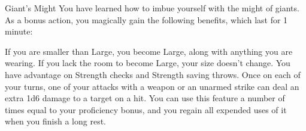 \begin{DndComment}[]{Giant's Might}
	You have learned how to imbue yourself with the might of giants. As a bonus action, you magically gain the following benefits, which last for 1 minute:

	If you are smaller than Large, you become Large, along with anything you are wearing. If you lack the room to become Large, your size doesn’t change.
	You have advantage on Strength checks and Strength saving throws.
	Once on each of your turns, one of your attacks with a weapon or an unarmed strike can deal an extra 1d6 damage to a target on a hit.
	You can use this feature a number of times equal to your proficiency bonus, and you regain all expended uses of it when you finish a long rest.
\end{DndComment}


\endgroup

